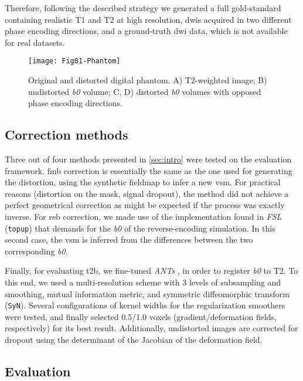 Therefore, following the described strategy we generated 
a full gold-standard containing realistic T1 and T2
at high resolution, \glspl*{dwi} acquired in two
different phase encoding directions, and a ground-truth
\gls*{dwi} data, which is not available for real datasets.


\begin{figure}[thpb]
   \centering
   \texttt{[image: Fig01-Phantom]}
   \caption{Original and distorted digital phantom.
   A) T2-weighted image; B) undistorted \textit{b0} volume;
   C, D) distorted \textit{b0} volumes with opposed phase encoding 
   directions.}
   \label{fig:label}
\end{figure}

\subsection{Correction methods}

Three out of four methods presented in \autoref{sec:intro}
were tested on the evaluation framework. \Gls*{fmb} correction
is essentially the same as the one used for generating the 
distortion, using the synthetic fieldmap to infer a new \gls*{vsm}.
For practical reasons (distortion on the mask, signal dropout), the
method did not achieve a perfect geometrical correction as might be
expected if the process was exactly inverse. For \Gls*{reb} correction,
we made use of the implementation found in \emph{FSL} (\texttt{topup})
that demands for the \textit{b0} of the reverse-encoding simulation.
In this second case, the \gls*{vsm} is inferred from the differences
between the two corresponding \textit{b0}.

Finally, for evaluating \Gls*{t2b},
we fine-tuned \emph{ANTs} \cite{avants_ants:_2013},
in order to register \textit{b0} to T2. To this end, we used a
multi-resolution scheme with 3 levels of subsampling and smoothing,
mutual information metric, and symmetric diffeomorphic transform 
(\texttt{SyN}). Several configurations of kernel widths for the 
regularization smoothers were tested, and finally selected 
0.5/1.0 voxels (gradient/deformation fields, respectively) 
for its best result. Additionally, undistorted images are 
corrected for dropout using the determinant
of the Jacobian of the deformation field.

\subsection{Evaluation}

